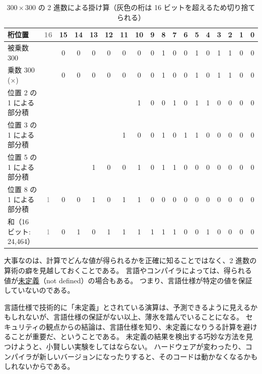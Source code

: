 \documentclass[uplatex]{jsarticle}
\def\label#1{}%
\begin{document}
\begin{table}[H]
\centering
\small
\setlength{\tabcolsep}{3pt}
\newcommand{\gr}[1]{\textcolor{gray}{#1}}
\begin{tabular}{l|c|*{16}{c}}
桁位置 & \gr{16} & 15 & 14 & 13 & 12 & 11 & 10 & 9 & 8 & 7 & 6 & 5 & 4 & 3 & 2 & 1 & 0 \\ \hline
被乗数 300 & & 0 & 0 & 0 & 0 & 0 & 0 & 0 & 1 & 0 & 0 & 1 & 0 & 1 & 1 & 0 & 0 \\
乗数 300 ($\times$) & & 0 & 0 & 0 & 0 & 0 & 0 & 0 & 1 & 0 & 0 & 1 & 0 & 1 & 1 & 0 & 0 \\ \hline
位置 2 の 1 による部分積 & & & & & & & 1 & 0 & 0 & 1 & 0 & 1 & 1 & 0 & 0 & 0 & 0 \\
位置 3 の 1 による部分積 & & & & & & 1 & 0 & 0 & 1 & 0 & 1 & 1 & 0 & 0 & 0 & 0 & 0 \\
位置 5 の 1 による部分積 & & & & 1 & 0 & 0 & 1 & 0 & 1 & 1 & 0 & 0 & 0 & 0 & 0 & 0 & 0 \\
位置 8 の 1 による部分積 & \gr{1} & 0 & 0 & 1 & 0 & 1 & 1 & 0 & 0 & 0 & 0 & 0 & 0 & 0 & 0 & 0 & 0 \\ \hline
和（16 ビット: 24,464） & \gr{1} & 0 & 1 & 0 & 1 & 1 & 1 & 1 & 1 & 1 & 0 & 0 & 1 & 0 & 0 & 0 & 0 \\
\end{tabular}
\caption{$300 \times 300$ の 2 進数による掛け算（灰色の桁は 16 ビットを超えるため切り捨てられる）}\label{tab:ch9-binary-multiplication}
\end{table}

大事なのは、計算でどんな値が得られるかを正確に知ることではなく、2 進数の算術の癖を見越しておくことである。
言語やコンパイラによっては、得られる値が\underline{未定義}（not defined）の場合もある。
つまり、言語仕様が特定の値を保証していないのである。

\begin{rem}[未定義の結果に頼らない]\label{rem:ch9-undefined-behavior}
言語仕様で技術的に「未定義」とされている演算は、予測できるように見えるかもしれないが、言語仕様の保証がない以上、薄氷を踏んでいることになる。
セキュリティの観点からの結論は、言語仕様を知り、未定義になりうる計算を避けることが重要だ、ということである。
未定義の結果を検出する巧妙な方法を見つけようと、小賢しい実験をしてはならない。
ハードウェアが変わったり、コンパイラが新しいバージョンになったりすると、そのコードは動かなくなるかもしれないからである。
\end{rem}
\end{document}
